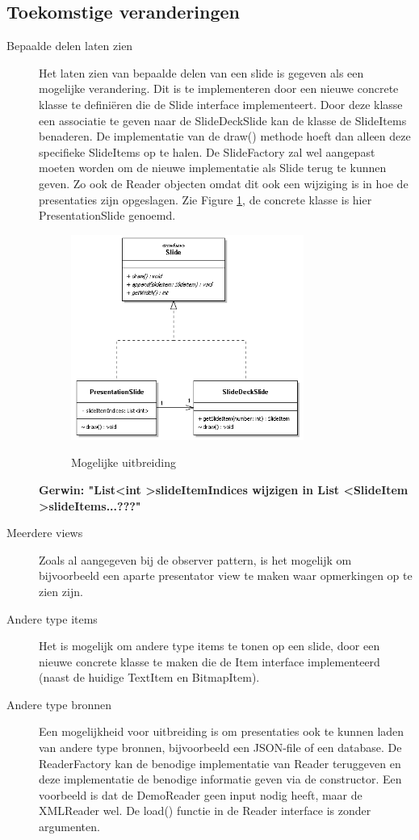 \documentclass[a4paper]{article}
\begin{document}
\subsection{Toekomstige veranderingen}
\begin{description}
\item[Bepaalde delen laten zien] Het laten zien van bepaalde delen van een slide is gegeven als een mogelijke verandering. Dit is te implementeren door een nieuwe concrete klasse te definiëren die de Slide interface implementeert. Door deze klasse een associatie te geven naar de SlideDeckSlide kan de klasse de SlideItems benaderen. De implementatie van de draw() methode hoeft dan alleen deze specifieke SlideItems op te halen. De SlideFactory zal wel aangepast moeten worden om de nieuwe implementatie als Slide terug te kunnen geven. Zo ook de Reader objecten omdat dit ook een wijziging is in hoe de presentaties zijn opgeslagen. Zie Figure \ref{fig:mogelijkeuitbreiding}, de concrete klasse is hier PresentationSlide genoemd.
\begin{figure}[htbp]
\caption{Mogelijke uitbreiding}
\centering
\includegraphics[width=0.75\textwidth]{MogelijkeUitbreiding.PNG}
\label{fig:mogelijkeuitbreiding}
\end{figure}

\textbf{Gerwin: "List\textless int \textgreater slideItemIndices wijzigen in List \textless SlideItem \textgreater slideItems...???"}

\item[Meerdere views] Zoals al aangegeven bij de observer pattern, is het mogelijk om bijvoorbeeld een aparte presentator view te maken waar opmerkingen op te zien zijn.
\item[Andere type items] Het is mogelijk om andere type items te tonen op een slide, door een nieuwe concrete klasse te maken die de Item interface implementeerd (naast de huidige TextItem en BitmapItem).
\item[Andere type bronnen] Een mogelijkheid voor uitbreiding is om presentaties ook te kunnen laden van andere type bronnen, bijvoorbeeld een JSON-file of een database. De ReaderFactory kan de benodige implementatie van Reader teruggeven en deze implementatie de benodige informatie geven via de constructor. Een voorbeeld is dat de DemoReader geen input nodig heeft, maar de XMLReader wel.  De load() functie in de Reader interface is zonder argumenten.
\end{description}
\end{document}
